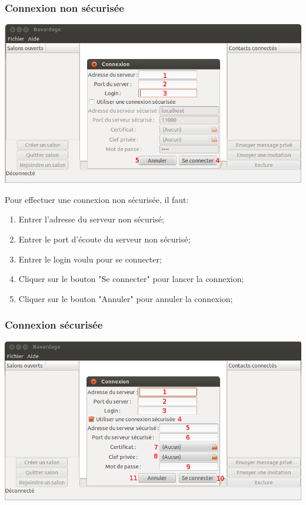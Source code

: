 \documentclass[a4paper,11pt,french]{book}
\begin{document}
\subsubsection{Connexion non sécurisée}
\includegraphics[width=40em]{capture/con_n_sec.png}

Pour effectuer une connexion non sécurisée, il faut:
\begin{enumerate}
    \item Entrer l'adresse du serveur non sécurisé;
    \item Entrer le port d'écoute du serveur non sécurisé;
    \item Entrer le login voulu pour se connecter;
    \item Cliquer sur le bouton "Se connecter" pour lancer la connexion;
    \item Cliquer sur le bouton "Annuler" pour annuler la connexion;
\end{enumerate}

\subsubsection{Connexion sécurisée}

\includegraphics[width=40em]{capture/con_sec.png}
\end{document}
